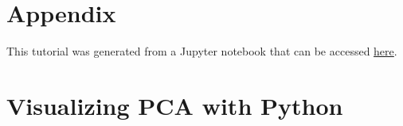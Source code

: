 \documentclass[10pt,twocolumn]{article}
\begin{document}
%
%
%
%
%
%
%
%
%
%



\newpage

\section*{Appendix}

\appendix

This tutorial was generated from a Jupyter notebook that can be accessed \href{https://github.com/kamilazdybal/ulb-atm-phd/blob/master/PCA/PCA-tutorial.ipynb}{here}.

\section{Visualizing PCA with Python}
\end{document}
